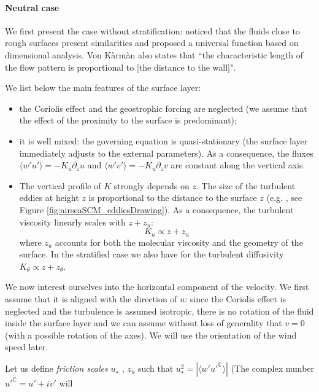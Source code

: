 \paragraph{Neutral case}
We first present the case without stratification:
\citep{karman_mechanische_1930} noticed that the
fluids close to rough surfaces present similarities and
proposed a universal function based on dimensional analysis.
Von Kàrmàn also states that ``the characteristic length
of the flow pattern is proportional to
[the distance to the wall]".
\par
We list below the main features of the surface layer:
\begin{itemize}
	\item the Coriolis effect and the geostrophic forcing are
		neglected (we assume that the effect of the
		proximity to the surface is predominant);
	\item it is well mixed: the governing equation
		is quasi-stationary (the surface layer
		immediately adjusts to the external parameters).
		As a consequence, the fluxes
		$\langle w'u'\rangle = -K_u \partial_z u$
		and
		$\langle w'v'\rangle = -K_u \partial_z v$
		are constant along the vertical axis.
	\item The vertical profile of $K$ strongly depends 
		on $z$.
		The size of the turbulent eddies at height $z$
		is proportional to the distance to the surface $z$
		(e.g. \cite{kawai_wall-modeling_2012}, see Figure
		\ref{fig:airseaSCM_eddiesDrawing}).
		As a consequence, the turbulent viscosity
		linearly scales with $z+z_u$:
		\begin{equation}
			K_u \propto z+z_u
		\end{equation}
		where $z_u$ accounts for both the molecular
		viscosity and the geometry of the surface.
		In the stratified case we also have for the turbulent
		diffusivity $K_\theta \propto z+z_\theta$.
\end{itemize}
We now interest ourselves into the horizontal component of
the velocity. We first assume that it is aligned with the
direction of $u$: since the Coriolis effect
is neglected and the turbulence is assumed isotropic,
there is no rotation of the fluid inside the surface layer
and we can assume without loss of generality that $v=0$
(with a possible rotation of the axes).
We will use the orientation of the wind speed later.
\par
Let us define \textit{friction scales} $u_\star$
, $z_{u}$ such that $u_\star^2 =
|\langle w' {u'}^{\mathbb{C}} \rangle|$
(The complex number ${u'}^{\mathbb{C}} = u'+iv'$ will
